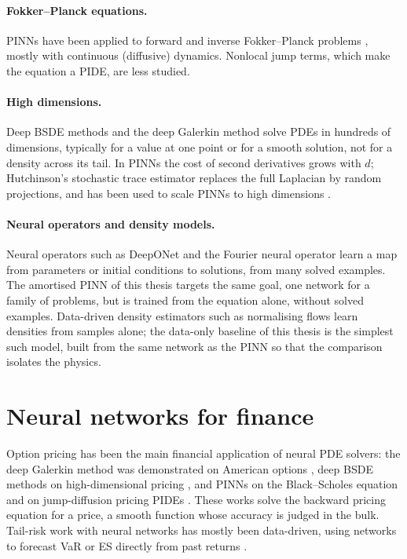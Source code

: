 \paragraph{Fokker--Planck equations.} PINNs have been applied to forward and inverse Fokker--Planck problems
\citep{chen2021fp}, mostly with continuous (diffusive) dynamics. Nonlocal jump terms, which make the equation a
PIDE, are less studied.

\paragraph{High dimensions.} Deep BSDE methods \citep{han2018} and the deep Galerkin method
\citep{sirignano2018} solve PDEs in hundreds of dimensions, typically for a value at one point or for a smooth
solution, not for a density across its tail. In PINNs the cost of second derivatives grows with $d$; Hutchinson's
stochastic trace estimator \citep{hutchinson1989} replaces the full Laplacian by random projections, and has been
used to scale PINNs to high dimensions \citep{hu2024}.

\paragraph{Neural operators and density models.} Neural operators such as DeepONet \citep{lu2021} and the Fourier
neural operator \citep{li2021} learn a map from parameters or initial conditions to solutions, from many solved
examples. The amortised PINN of this thesis targets the same goal, one network for a family of problems, but is
trained from the equation alone, without solved examples. Data-driven density estimators such as normalising
flows \citep{papamakarios2021} learn densities from samples alone; the data-only baseline of this thesis is the
simplest such model, built from the same network as the PINN so that the comparison isolates the physics.

\section{Neural networks for finance}
\label{sec:lit-pinnfin}

Option pricing has been the main financial application of neural PDE solvers: the deep Galerkin method was
demonstrated on American options \citep{sirignano2018}, deep BSDE methods on high-dimensional pricing
\citep{han2018}, and PINNs on the Black--Scholes equation and on jump-diffusion pricing PIDEs
. These works solve the backward
pricing equation for a price, a smooth function whose accuracy is judged in the bulk. Tail-risk work with neural
networks has mostly been data-driven, using networks to forecast VaR or ES directly from past returns
.

